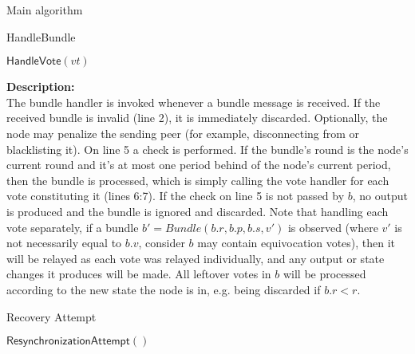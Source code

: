 \documentclass[10pt,a4paper]{article}
\begin{document}
\begin{section}{Main algorithm}
\begin{subsection}{HandleBundle}
\begin{algorithm}[H]
\begin{algorithmic}[1]
                    \State $\mathsf{HandleVote}(vt)$
                \EndFor
            \EndIf


        \EndFunction
        \end{algorithmic}
    \end{algorithm}
    
    
    \noindent \textbf{Description:}\\
The bundle handler is invoked whenever a bundle message is received. 
If the received bundle is invalid (line 2), it is immediately discarded. Optionally, the node may
penalize the sending peer (for example, disconnecting from or blacklisting it).
On line 5 a check is performed. 
If the bundle's round is the node's current round and it's at most one period behind of the node's current period, 
then the bundle is processed, which is simply calling the vote handler for each 
vote constituting it (lines 6:7). If the check on line 5 is not passed by $b$, no output is produced
and the bundle is ignored and discarded.
Note that handling each vote separately, if a bundle $b\prime = Bundle(b.r, b.p, b.s, v\prime)$ is observed
(where $v\prime$ is not necessarily equal to $b.v$, consider $b$ may contain equivocation votes), then it will be relayed
as each vote was relayed individually, and any output or state changes it produces will be made. All leftover votes 
in $b$ will be processed according to the new state the node is in, e.g. being discarded if $b.r < r$.
    
\end{subsection}


\begin{subsection}{Recovery Attempt}
    \label{ssect:Recovery}

    \begin{algorithm}[H]
        \caption{\underline{Recovery}}
        \label{algo:recovery}
        \begin{algorithmic}[1]

        \State $\mathsf{ResynchronizationAttempt}()$
    

\end{algorithmic}
\end{algorithm}
\end{subsection}
\end{section}
\end{document}
